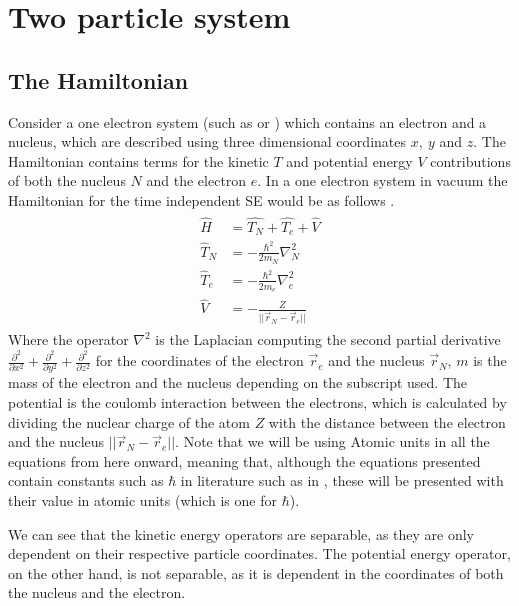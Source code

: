 \documentclass[../master_thesis.tex]{subfiles}
\begin{document}
\section{Two particle system}
\subsection{The Hamiltonian}
Consider a one electron system (such as  or ) which contains an
electron and a nucleus, which are described using three dimensional coordinates
$ x,\ y $ and $ z $. The Hamiltonian contains terms for the kinetic $T$ and
potential energy $V$ contributions of both the nucleus $ N $ and the electron
$ e $. In a one electron system in vacuum the Hamiltonian for the time independent
\ac{SE} would be as follows \cite{Jensen:2017, Cramer:2004}.
\begin{align}
  \begin{split}
    \hat{H}   &= \hat{T_N} + \hat{T_e} + \hat{V} \\
    \hat{T}_N &= -\frac{\hbar^2}{2m_N}\nabla^2_N \\
    \hat{T}_e &= -\frac{\hbar^2}{2m_e}\nabla^2_e \\
    \hat{V}   &= -\frac{Z}{||\vec{r}_N - \vec{r}_e||} \label{eq:twopH}
  \end{split}
\end{align}
Where the operator $ \nabla^2$ is the Laplacian computing the second partial
derivative $ \frac{\partial^2}{\partial x^2} + \frac{\partial^2}{\partial y^2} +
\frac{\partial^2}{\partial z^2} $ for the coordinates of the electron $\vec{r}_e$
and the nucleus $\vec{r}_N$, $ m $ is the mass of the electron and the nucleus
depending on the subscript used. The potential is the coulomb interaction
between the electrons, which is calculated by dividing the nuclear charge of the
atom $ Z $ with the distance between the electron and the nucleus
$ ||\vec{r}_N - \vec{r}_e|| $. Note that we will be using Atomic units in all
the equations from here onward, meaning that, although the equations presented
contain constants such as $\hbar$ in literature such as in \cite{Atkins:2014},
these will be presented with their value in atomic units (which is one for
$\hbar$).

We can see that the kinetic energy operators are separable, as they are only
dependent on their respective particle coordinates. The potential energy
operator, on the other hand, is not separable, as it is dependent in the
coordinates of both the nucleus and the electron.
\end{document}
